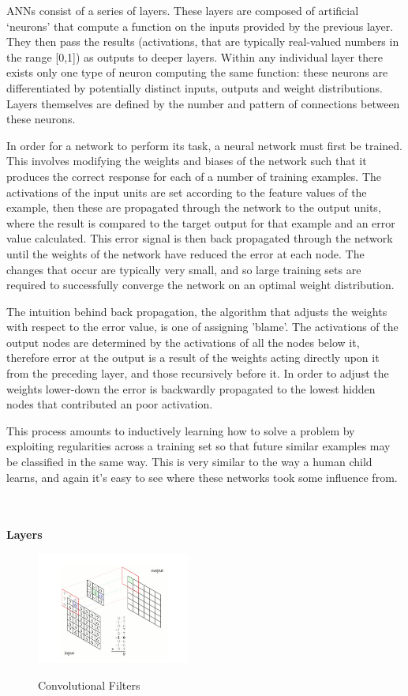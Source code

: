 \documentclass[a4paper,11pt,titlepage]{article}
\begin{document}
		ANNs consist of a series of layers. These layers are composed of artificial `neurons' that compute a function on the inputs provided by the previous layer. They then pass the results (activations, that are typically real-valued numbers in the range [0,1]) as outputs to deeper layers. Within any individual layer there exists only one type of neuron computing the same function: these neurons are differentiated by potentially distinct inputs, outputs and weight distributions. Layers themselves are defined by the number and pattern of connections between these neurons. 
		\par 
		In order for a network to perform its task, a neural network must first be trained. This involves modifying the weights and biases of the network such that it produces the correct response for each of a number of training examples. The activations of the input units are set according to the feature values of the example, then these are propagated through the network to the output units, where the result is compared to the target output for that example and an error value calculated. This error signal is then back propagated through the network until the weights of the network have reduced the error at each node. The changes that occur are typically very small, and so large training sets are required to successfully converge the network on an optimal weight distribution. 		
		\par 
		The intuition behind back propagation, the algorithm that adjusts the weights with respect to the error value, is one of assigning 'blame'. The activations of the output nodes are determined by the activations of all the nodes below it, therefore error at the output is a result of the weights acting directly upon it from the preceding layer, and those recursively before it. In order to adjust the weights lower-down the error is backwardly propagated to the lowest hidden nodes that contributed an poor activation.			\par
		This process amounts to inductively learning how to solve a problem by exploiting regularities across a training set so that future similar examples may be classified in the same way. This is very similar to the way a human child learns, and again it's easy to see where these networks took some influence from.
\\\
\\\

\textbf{Layers}

		\begin{figure}[H]
    			\centering	
    			{{\includegraphics[width=0.45\textwidth]
    				{img/convolutional_network.png} 
    			}}%
    			\caption{Convolutional Filters}%
    			\label{fig:convfilters}
		\end{figure}		
\end{document}

